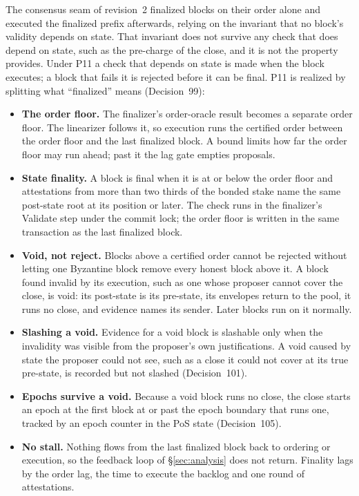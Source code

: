 \documentclass[11pt]{article}
\newcommand{\code}{\path}
\begin{document}
The consensus seam of revision~2 finalized blocks on their order alone and executed the finalized prefix afterwards, relying on the invariant that no block's validity depends on state. That invariant does not survive any check that does depend on state, such as the pre-charge of the close, and it is not the property \code{dev} provides. Under P11 a check that depends on state is made when the block executes; a block that fails it is rejected before it can be final. P11 is realized by splitting what ``finalized'' means (Decision~99):
\begin{itemize}
\item \textbf{The order floor.} The finalizer's order-oracle result becomes a separate order floor. The linearizer follows it, so execution runs the certified order between the order floor and the last finalized block. A bound \code{max\_unattested} limits how far the order floor may run ahead; past it the lag gate empties proposals.
\item \textbf{State finality.} A block is final when it is at or below the order floor and attestations from more than two thirds of the bonded stake name the same post-state root at its position or later. The check runs in the finalizer's Validate step under the commit lock; the order floor is written in the same transaction as the last finalized block.
\item \textbf{Void, not reject.} Blocks above a certified order cannot be rejected without letting one Byzantine block remove every honest block above it. A block found invalid by its execution, such as one whose proposer cannot cover the close, is void: its post-state is its pre-state, its envelopes return to the pool, it runs no close, and evidence names its sender. Later blocks run on it normally.
\item \textbf{Slashing a void.} Evidence for a void block is slashable only when the invalidity was visible from the proposer's own justifications. A void caused by state the proposer could not see, such as a close it could not cover at its true pre-state, is recorded but not slashed (Decision~101).
\item \textbf{Epochs survive a void.} Because a void block runs no close, the close starts an epoch at the first block at or past the epoch boundary that runs one, tracked by an epoch counter in the PoS state (Decision~105).
\item \textbf{No stall.} Nothing flows from the last finalized block back to ordering or execution, so the feedback loop of \S\ref{sec:analysis} does not return. Finality lags by the order lag, the time to execute the backlog and one round of attestations.
\end{itemize}
\end{document}
